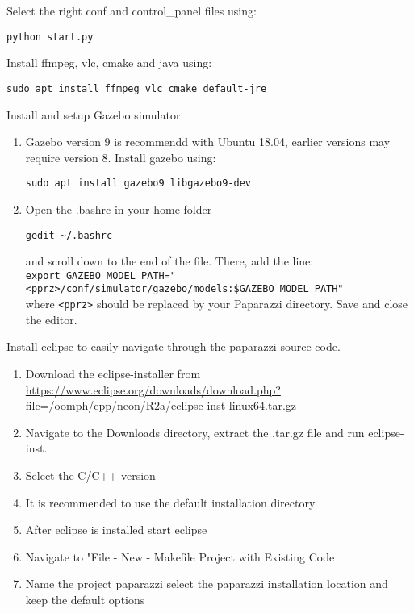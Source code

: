 \documentclass{article}
\begin{document}
\begin{enumerate}
{\item{Select the right conf and control\_panel files using:
\begin{lstlisting}[style=Bash]
python start.py
\end{lstlisting}
}
\item{Install ffmpeg, vlc, cmake and java using:
\begin{lstlisting}[style=Bash]
sudo apt install ffmpeg vlc cmake default-jre
\end{lstlisting}
}
}
\item{Install and setup Gazebo simulator.
\begin{enumerate}
\item{Gazebo version 9 is recommendd with Ubuntu 18.04, earlier versions may require version 8. Install gazebo using:
\begin{lstlisting}[style=Bash]
sudo apt install gazebo9 libgazebo9-dev
\end{lstlisting}
}
\item{Open the .bashrc in your home folder
\begin{lstlisting}[style=Bash]
gedit ~/.bashrc
\end{lstlisting}
 and scroll down to the end of the file. There, add the line:\\
\verb|export GAZEBO_MODEL_PATH="<pprz>/conf/simulator/gazebo/models:$GAZEBO_MODEL_PATH"|\\
where \verb"<pprz>" should be replaced by your Paparazzi directory. Save and close the editor.}
\end{enumerate}}
\item{Install eclipse to easily navigate through the paparazzi source code.
\begin{enumerate}
\item{Download the eclipse-installer from \url{https://www.eclipse.org/downloads/download.php?file=/oomph/epp/neon/R2a/eclipse-inst-linux64.tar.gz}}
\item{Navigate to the Downloads directory, extract the .tar.gz file and run eclipse-inst.}
\item{Select the C/C++ version}
\item{It is recommended to use the default installation directory}
\item{After eclipse is installed start eclipse}
\item{Navigate to "File - New - Makefile Project with Existing Code}
\item{Name the project paparazzi select the paparazzi installation location and keep the default options}

\end{enumerate}}
\end{enumerate}
\end{document}
